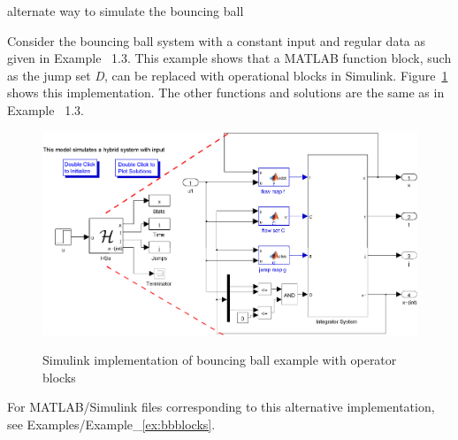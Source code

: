 \begin{example}{alternate way to simulate the bouncing ball}
\label{ex:bbblocks}

Consider the bouncing ball system with a constant input and regular data as given in Example ~1.3. This example shows that a MATLAB function block, such as the jump set {\em D}, can be replaced with operational blocks in Simulink. Figure~\ref{fig:bbblocks} shows this implementation. The other functions and solutions are the same as in Example ~1.3.

\begin{figure}[ht]
  \begin{center}
    {\includegraphics[width=.95\textwidth]{figures/Simulink/HybridSimulatorBBblocks}}
   \caption{Simulink implementation of bouncing ball example with operator blocks}
\label{fig:bbblocks}
  \end{center}
\end{figure}

For MATLAB/Simulink files corresponding to this alternative implementation, see Examples/Example\_\ref{ex:bbblocks}.

\end{example}
